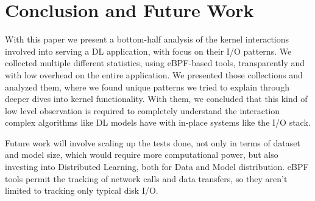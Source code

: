 \documentclass[conference]{IEEEtran}
\begin{document}



\section{Conclusion and Future Work}

With this paper we present a bottom-half analysis of the kernel interactions involved into serving a DL application, with focus on their I/O patterns. We collected multiple different statistics, using eBPF-based tools, transparently and with low overhead on the entire application. We presented those collections and analyzed them, where we found unique patterns we tried to explain through deeper dives into kernel functionality. With them, we concluded that this kind of low level observation is required to completely understand the interaction complex algorithms like DL models have with in-place systems like the I/O stack.

Future work will involve scaling up the tests done, not only in terms of dataset and model size, which would require more computational power, but also investing into Distributed Learning, both for Data and Model distribution. eBPF tools permit the tracking of network calls and data transfers, so they aren't limited to tracking only typical disk I/O.
\end{document}
